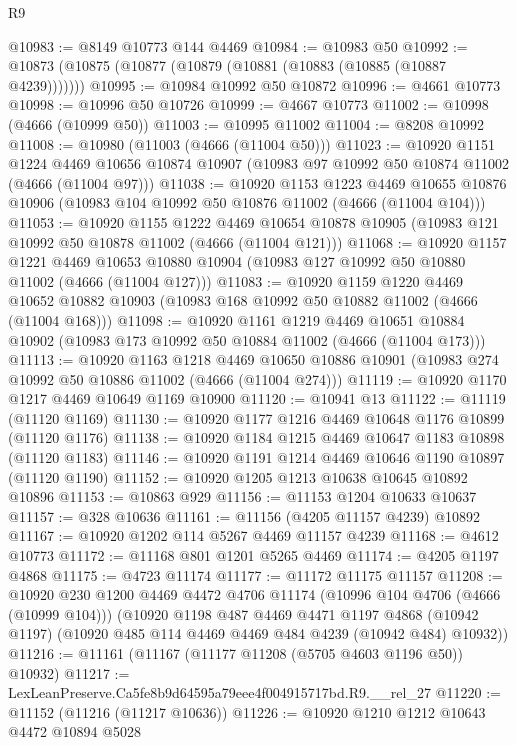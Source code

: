 \begin{lexlean}{R9}
\begin{coremodule}
@10983 := @8149 @10773 @144 @4469
@10984 := @10983 @50
@10992 := @10873 (@10875 (@10877 (@10879 (@10881 (@10883 (@10885 (@10887 @4239)))))))
@10995 := @10984 @10992 @50 @10872
@10996 := @4661 @10773
@10998 := @10996 @50 @10726
@10999 := @4667 @10773
@11002 := @10998 (@4666 (@10999 @50))
@11003 := @10995 @11002
@11004 := @8208 @10992
@11008 := @10980 (@11003 (@4666 (@11004 @50)))
@11023 := @10920
    @1151
    @1224
    @4469
    @10656
    @10874
    @10907
    (@10983 @97 @10992 @50 @10874 @11002 (@4666 (@11004 @97)))
@11038 := @10920
    @1153
    @1223
    @4469
    @10655
    @10876
    @10906
    (@10983 @104 @10992 @50 @10876 @11002 (@4666 (@11004 @104)))
@11053 := @10920
    @1155
    @1222
    @4469
    @10654
    @10878
    @10905
    (@10983 @121 @10992 @50 @10878 @11002 (@4666 (@11004 @121)))
@11068 := @10920
    @1157
    @1221
    @4469
    @10653
    @10880
    @10904
    (@10983 @127 @10992 @50 @10880 @11002 (@4666 (@11004 @127)))
@11083 := @10920
    @1159
    @1220
    @4469
    @10652
    @10882
    @10903
    (@10983 @168 @10992 @50 @10882 @11002 (@4666 (@11004 @168)))
@11098 := @10920
    @1161
    @1219
    @4469
    @10651
    @10884
    @10902
    (@10983 @173 @10992 @50 @10884 @11002 (@4666 (@11004 @173)))
@11113 := @10920
    @1163
    @1218
    @4469
    @10650
    @10886
    @10901
    (@10983 @274 @10992 @50 @10886 @11002 (@4666 (@11004 @274)))
@11119 := @10920 @1170 @1217 @4469 @10649 @1169 @10900
@11120 := @10941 @13
@11122 := @11119 (@11120 @1169)
@11130 := @10920 @1177 @1216 @4469 @10648 @1176 @10899 (@11120 @1176)
@11138 := @10920 @1184 @1215 @4469 @10647 @1183 @10898 (@11120 @1183)
@11146 := @10920 @1191 @1214 @4469 @10646 @1190 @10897 (@11120 @1190)
@11152 := @10920 @1205 @1213 @10638 @10645 @10892 @10896
@11153 := @10863 @929
@11156 := @11153 @1204 @10633 @10637
@11157 := @328 @10636
@11161 := @11156 (@4205 @11157 @4239) @10892
@11167 := @10920 @1202 @114 @5267 @4469 @11157 @4239
@11168 := @4612 @10773
@11172 := @11168 @801 @1201 @5265 @4469
@11174 := @4205 @1197 @4868
@11175 := @4723 @11174
@11177 := @11172 @11175 @11157
@11208 := @10920
    @230
    @1200
    @4469
    @4472
    @4706
    @11174
    (@10996 @104 @4706 (@4666 (@10999 @104)))
    (@10920
      @1198
      @487
      @4469
      @4471
      @1197
      @4868
      (@10942 @1197)
      (@10920 @485 @114 @4469 @4469 @484 @4239 (@10942 @484) @10932))
@11216 := @11161 (@11167 (@11177 @11208 (@5705 @4603 @1196 @50)) @10932)
@11217 := LexLeanPreserve.Ca5fe8b9d64595a79eee4f004915717bd.R9.__rel_27
@11220 := @11152 (@11216 (@11217 @10636))
@11226 := @10920 @1210 @1212 @10643 @4472 @10894 @5028

\end{coremodule}
\end{lexlean}
